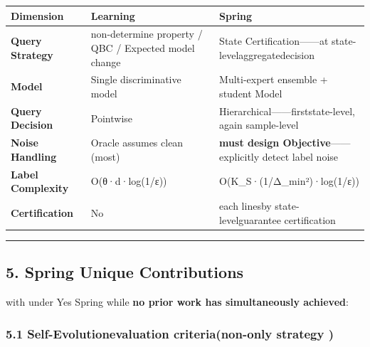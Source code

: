 \documentclass[
  12pt,
]{article}
\begin{document}
\begin{longtable}[]{@{}
  >{\raggedright\arraybackslash}p{}
  >{\raggedright\arraybackslash}p{}
  >{\raggedright\arraybackslash}p{}@{}}
\toprule\noalign{}
\begin{minipage}[b]{\linewidth}\raggedright
Dimension
\end{minipage} & \begin{minipage}[b]{\linewidth}\raggedright
Learning
\end{minipage} & \begin{minipage}[b]{\linewidth}\raggedright
Spring
\end{minipage} \\
\midrule\noalign{}
\endhead
\bottomrule\noalign{}
\endlastfoot
\textbf{Query Strategy} & non-determine property  / QBC / Expected model change &
State Certification------at state-levelaggregatedecision \\
\textbf{Model} & Single discriminative model & Multi-expert ensemble + student Model \\
\textbf{Query Decision} & Pointwise & Hierarchical------firststate-level, again sample-level \\
\textbf{Noise Handling} & Oracle assumes clean (most) &
\textbf{must design Objective}------explicitly detect label noise \\
\textbf{Label Complexity} & O(θ·d·log(1/ε)) & O(K\_S·(1/Δ\_min²)·log(1/ε)) \\
\textbf{Certification} & No & each linesby state-levelguarantee certification \\
\end{longtable}

\begin{center}\rule{0.5\linewidth}{0.5pt}\end{center}

\subsection{5. Spring
Unique Contributions}\label{spring-ux72ecux6709ux7684ux8d21ux732e}

with under Yes Spring while \textbf{no prior work has simultaneously achieved}:

\subsubsection{5.1
Self-Evolutionevaluation criteria(non-only strategy )}\label{ux81eaux8fdbux5316ux8bc4ux4f30ux6807ux51c6ux4e0dux4ec5ux81eaux6539ux8fdbux7b56ux7565}
\end{document}
